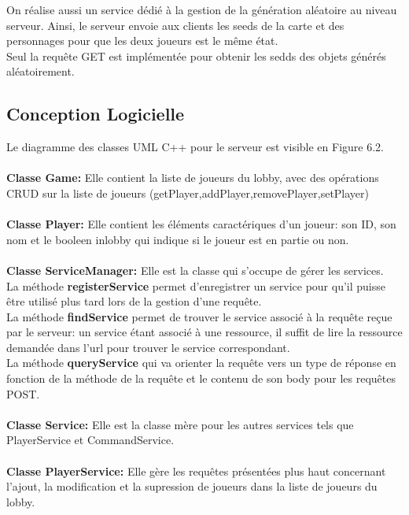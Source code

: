 On réalise aussi un service dédié 
à la gestion de la génération 
aléatoire au niveau serveur.
Ainsi, le serveur envoie aux 
clients les seeds de la carte et 
des personnages pour que les deux 
joueurs est le même état.
\\Seul la requête GET est 
implémentée pour obtenir les sedds 
des objets générés aléatoirement.

\subsection{Conception Logicielle}

Le diagramme des classes UML C++ pour le serveur est
visible en Figure 6.2.
\\\\
\textbf{Classe Game:} Elle contient la liste de joueurs du 
lobby, 
avec des opérations CRUD sur la liste de joueurs 
(getPlayer,addPlayer,removePlayer,setPlayer)
\\\\
\textbf{Classe Player:} Elle contient les éléments 
caractériques d'un joueur: son ID, son nom et le booleen 
inlobby qui indique si le joueur est en partie ou non. 
\\\\
\textbf{Classe ServiceManager:} Elle est la classe qui 
s'occupe de gérer les services. 
\\La méthode \textbf{registerService}
permet d'enregistrer un service pour qu'il puisse être 
utilisé plus tard lors de la gestion d'une requête.
\\La méthode \textbf{findService} permet 
de trouver le service associé 
à la requête reçue par le serveur: un service étant associé 
à une ressource, il suffit de lire la ressource demandée 
dans l'url pour trouver le service correspondant.
\\La méthode \textbf{queryService} qui va orienter la 
requête vers un type de réponse en fonction 
de la méthode de la requête et 
le contenu de son body pour les requêtes POST.
\\\\
\textbf{Classe Service:} Elle est la classe mère pour
les autres services tels que PlayerService et 
CommandService.
\\\\
\textbf{Classe PlayerService:} Elle gère les requêtes 
présentées plus haut concernant l'ajout, la modification et 
la supression de joueurs dans la liste de joueurs du lobby. 
\\\\
